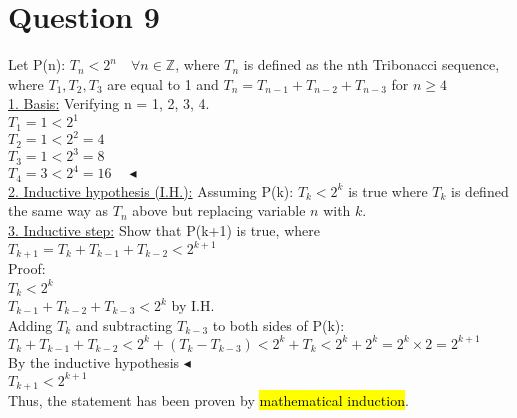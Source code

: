 \documentclass[a4paper, 12pt]{article}
\begin{document}
\section*{Question 9}

Let P(n): $T_{n} < 2^n \quad \forall n \in \mathbb{Z}$, where $T_{n}$ is defined as the  nth Tribonacci sequence, where $T_{1}, T_{2}, T_{3}$ are equal to 1 and $T_{n} = T_{n-1} + T_{n-2} + T_{n-3}$ for $n \geq 4$\\

\underline{1. Basis:} Verifying n = 1, 2, 3, 4.\\

$T_{1} = 1 < 2^1$\\
$T_{2} = 1 < 2^2 = 4$\\
$T_{3} = 1 < 2^3 = 8$\\
$T_{4} = 3 < 2^4 = 16 \quad \blacktriangleleft$\\

\underline{2. Inductive hypothesis (I.H.):} Assuming P(k): $T_{k} < 2^k$ is true where $T_{k}$ is defined the same way as $T_{n}$ above but replacing variable $n$ with $k$.\\

\underline{3. Inductive step:} Show that P(k+1) is true, where $T_{k+1}= T_{k}+T_{k-1}+T_{k-2} < 2^{k+1}$\\

Proof:\\

$T_{k} < 2^k$\\
$T_{k-1}+T_{k-2}+T_{k-3} < 2^k$ by I.H.\\ 

Adding $T_{k}$  and subtracting $T_{k-3}$ to both sides of P(k):\\

$T_{k}+T_{k-1}+T_{k-2} < 2^k +(T_{k}-T_{k-3}) < 2^k+T_{k} < 2^k+2^k = 2^k \times 2 = 2^{k+1}\quad$  By the inductive hypothesis $\blacktriangleleft$\\
$T_{k+1} < 2^{k+1}$\\

Thus, the statement has been proven by \hl{mathematical induction}.\\


\\
\smiley{}
\end{document}
